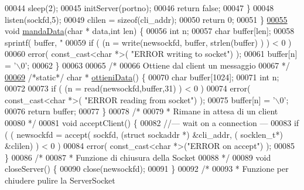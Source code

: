\begin{DoxyCode}
{00044                  sleep(2);
00045                  initServer(portno);
00046                  \textcolor{keywordflow}{return} \textcolor{keyword}{false};
00047      \}
00048      listen(sockfd,5);
00049      clilen = \textcolor{keyword}{sizeof}(cli\_addr);
00050      \textcolor{keywordflow}{return} 0;
00051 \}
\hypertarget{ServerUtil_8cpp_source_l00055}{}\hyperlink{ServerUtil_8cpp_a7329f619144deb41baf72e83a7073701}{00055} \textcolor{keywordtype}{void} \hyperlink{ServerUtil_8cpp_a7329f619144deb41baf72e83a7073701}{mandaData}(\textcolor{keywordtype}{char} * data,\textcolor{keywordtype}{int} len)  \{
00056   \textcolor{keywordtype}{int} n;
00057   \textcolor{keywordtype}{char} buffer[len];
00058   sprintf( buffer, \textcolor{stringliteral}{"%
00059   \textcolor{keywordflow}{if} ( (n = write(newsockfd, buffer, strlen(buffer) ) ) < 0 )
00060     error( const\_cast<char *>( \textcolor{stringliteral}{"ERROR writing to socket"}) );
00061   buffer[n] = \textcolor{charliteral}{'\(\backslash\)0'};
00062 \}
00063 
00065 \textcolor{comment}{/*}
00066 \textcolor{comment}{     Ottiene dal client un messaggio}
00067 \textcolor{comment}{ */}
\hypertarget{ServerUtil_8cpp_source_l00069}{}\hyperlink{ServerUtil_8cpp_af4ec6cff50fa0e44047464b9b8c912d4}{00069} \textcolor{comment}{/*static*/} \textcolor{keywordtype}{char} * \hyperlink{ServerUtil_8cpp_af4ec6cff50fa0e44047464b9b8c912d4}{ottieniData}() \{
00070   \textcolor{keywordtype}{char} buffer[1024];
00071   \textcolor{keywordtype}{int} n;
00072 
00073   \textcolor{keywordflow}{if} ( (n = read(newsockfd,buffer,31) ) < 0 )
00074     error( const\_cast<char *>( \textcolor{stringliteral}{"ERROR reading from socket"}) );
00075   buffer[n] = \textcolor{charliteral}{'\(\backslash\)0'};
00076   \textcolor{keywordflow}{return} buffer;
00077 \}
00078 \textcolor{comment}{/*}
00079 \textcolor{comment}{ * Rimane in attesa di un client}
00080 \textcolor{comment}{ */}
00081 \textcolor{keywordtype}{void} acceptClient() \{
00082 \textcolor{comment}{//--- wait on a connection ---}
00083     \textcolor{keywordflow}{if} ( ( newsockfd = accept( sockfd, (\textcolor{keyword}{struct} sockaddr *) &cli\_addr, (
      socklen\_t*) &clilen) ) < 0 )
00084         error( const\_cast<char *>(\textcolor{stringliteral}{"ERROR on accept"}) );
00085 \}
00086 \textcolor{comment}{/*}
00087 \textcolor{comment}{ * Funzione di chiusura della Socket}
00088 \textcolor{comment}{ */}
00089 \textcolor{keywordtype}{void} closeServer() \{
00090    close(newsockfd);
00091 \}
00092 \textcolor{comment}{/*}
00093 \textcolor{comment}{ * Funzione per chiudere pulire la ServerSocket}
}}
\end{DoxyCode}
